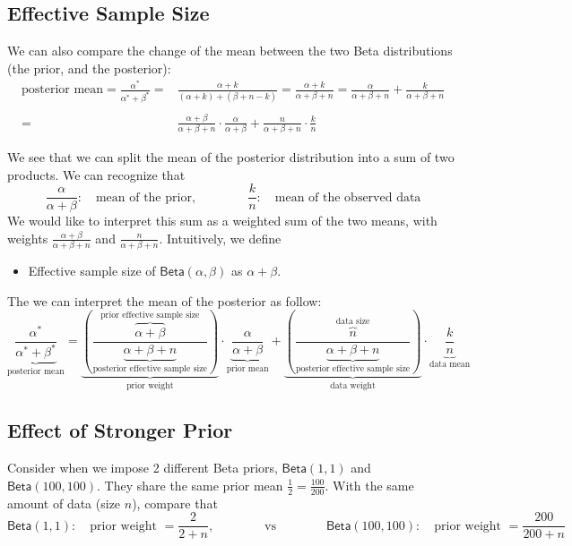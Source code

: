 \documentclass{article}
\def\dsst{\displaystyle}
\begin{document}
\subsection{Effective Sample Size}

We can also compare the change of the mean between the two Beta distributions (the prior, and the posterior):
\begin{align*}
\text{posterior mean} = \frac{\alpha^*}{\alpha^*+\beta^*} = &  \frac{\alpha+k}{(\alpha+k)+(\beta+n-k)}=\frac{\alpha+k}{\alpha+\beta+n} = \frac{\alpha}{\alpha+\beta+n} + \frac{k}{\alpha+\beta+n}\\
& \\
= & \frac{\alpha+\beta}{\alpha+\beta+n}\cdot \frac{\alpha}{\alpha+\beta} + \frac{n}{\alpha+\beta+n}\cdot \frac{k}{n}
\end{align*}


We see that we can split the mean of the posterior distribution into a sum of two products. We can recognize that 
$$ \frac{\alpha}{\alpha+\beta}:\quad \text{mean of the prior},\qquad \qquad \frac{k}{n}:\quad \text{mean of the observed data}$$
We would like to interpret this sum as a weighted sum of the two means, with weights $\dsst \frac{\alpha+\beta}{\alpha+\beta+n}$ and $\dsst \frac{n}{\alpha+\beta+n}$. Intuitively, we define
\begin{itemize}
	\item Effective sample size of $\textsf{Beta}(\alpha, \beta)$ as $\alpha + \beta$.
\end{itemize}

The we can interpret the mean of the posterior as follow:
$$\underbrace{\frac{\alpha^*}{\alpha^*+\beta^*}}_\text{posterior mean} = \underbrace{\left(\frac{\overbrace{\alpha+\beta}^\text{prior effective sample size}}{\underbrace{\alpha+\beta+n}_\text{posterior effective sample size}}\right)}_\text{prior weight}\cdot \underbrace{\frac{\alpha}{\alpha+\beta}}_\text{prior mean}+ \underbrace{\left(\frac{\overbrace{n}^\text{data size}}{\underbrace{\alpha+\beta+n}_\text{posterior effective sample size}}\right)}_\text{data weight}\cdot \underbrace{\frac{k}{n}}_\text{data mean} $$

\subsection{Effect of Stronger Prior}

Consider when we impose 2 different Beta priors, $\textsf{Beta}(1, 1)$ and $\textsf{Beta}(100, 100)$. They share the same prior mean $\dsst \frac{1}{2}=\frac{100}{200}$. With the same amount of data (size $n$), compare that
$$ \textsf{Beta}(1,1): \quad \text{prior weight }= \frac{2}{2+n},\qquad \qquad \text{vs} \qquad \qquad \textsf{Beta}(100, 100):\quad \text{prior weight }= \frac{200}{200+n} $$
\end{document}
